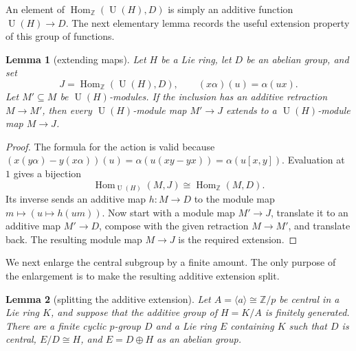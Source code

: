 \documentclass[10pt]{article}
\newtheorem{lemma}{Lemma}
\newcommand{\Z}{\mathbb Z}
\newcommand{\U}{\operatorname U}
\newcommand{\Hom}{\operatorname {Hom}}
\begin{document}
An element of $\Hom_{\Z}(\U(H),D)$ is simply an additive function
$\U(H)\to D$.  The next elementary lemma records the useful extension
property of this group of functions.

\begin{lemma}[extending maps]\label{lem:coinduced-extension}
Let $H$ be a Lie ring, let $D$ be an abelian group, and set
\[
 J=\Hom_{\Z}(\U(H),D),\qquad (x\alpha)(u)=\alpha(ux).
\]
Let $M'\subseteq M$ be $\U(H)$-modules.  If the inclusion has an additive
retraction $M\to M'$, then every $\U(H)$-module map $M'\to J$ extends to a
$\U(H)$-module map $M\to J$.
\end{lemma}

\begin{proof}
The formula for the action is valid because
$(x(y\alpha)-y(x\alpha))(u)=\alpha(u(xy-yx))=\alpha(u[x,y])$.
Evaluation at $1$ gives a bijection
\[
 \Hom_{\U(H)}(M,J)\cong\Hom_{\Z}(M,D).
\]
Its inverse sends an additive map $h:M\to D$ to the module map
$m\mapsto(u\mapsto h(um))$.  Now start with a module map $M'\to J$,
translate it to an additive map $M'\to D$, compose with the given retraction
$M\to M'$, and translate back.  The resulting module map $M\to J$ is the
required extension.
\end{proof}

We next enlarge the central subgroup by a finite amount.  The only purpose
of the enlargement is to make the resulting additive extension split.

\begin{lemma}[splitting the additive extension]\label{lem:finite-pushout}
Let $A=\langle a\rangle\cong\Z/p$ be central in a Lie ring $K$, and suppose
that the additive group of $H=K/A$ is finitely generated.  There are a finite
cyclic $p$-group $D$ and a Lie ring $E$ containing $K$ such that $D$ is
central, $E/D\cong H$, and $E=D\oplus H$ as an abelian group.
\end{lemma}
\end{document}
